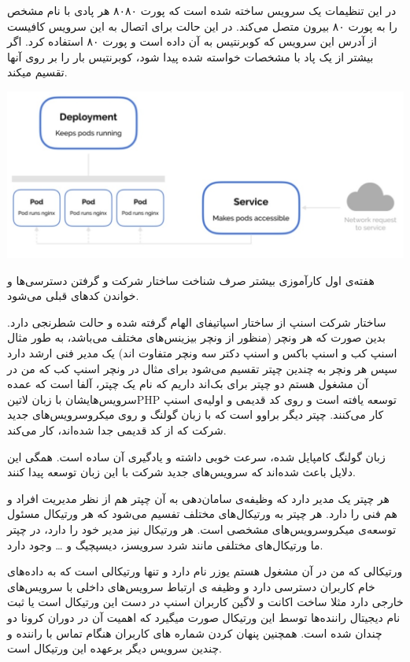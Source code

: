 \documentclass[a4]{report}
\begin{document}
در این تنظیمات یک سرویس ساخته شده است که پورت ۸۰۸۰ هر پادی با نام مشخص را به پورت ۸۰
بیرون متصل می‌کند. در این حالت برای اتصال به این سرویس کافیست از آدرس این سرویس که کوبرنتیس
به آن داده است و پورت ۸۰ استفاده کرد. اگر بیشتر از یک پاد با مشخصات خواسته شده پیدا شود، کوبرنتیس
بار را بر روی آنها تقسیم میکند.

\includegraphics[scale=0.5]{fig/service}


هفته‌ی اول کارآموزی بیشتر صرف شناخت ساختار شرکت و گرفتن دسترسی‌ها و خواندن کدهای قبلی می‌شود.

ساختار شرکت اسنپ از ساختار اسپاتیفای الهام گرفته شده و حالت شطرنجی دارد.
بدین صورت که هر ونچر (منظور از ونچر بیزینس‌های مختلف می‌باشد،
به طور مثال اسنپ کب و اسنپ باکس و اسنپ دکتر سه ونچر متفاوت اند)
یک مدیر فنی ارشد دارد سپس هر ونچر به چندین چپتر تقسیم می‌شود برای مثال در ونچر اسنپ کب که من در آن مشغول هستم
دو چپتر برای بک‌اند داریم که نام یک چپتر، آلفا است که عمده سرویس‌هایشان با زبان ‌لاتین{PHP} توسعه یافته است و روی کد قدیمی و اولیه‌ی اسنپ کار می‌کنند.
چپتر دیگر براوو است که با زبان گولنگ و روی میکروسرویس‌های جدید شرکت که از کد قدیمی جدا شده‌اند، کار می‌کند.

زبان گولنگ کامپایل شده، سرعت خوبی داشته و یادگیری آن ساده است. همگی این دلایل باعث شده‌اند که سرویس‌های جدید شرکت با این زبان توسعه پیدا کنند.

هر چپتر یک مدیر دارد که وظیفه‌ی سامان‌دهی به آن چپتر هم از نظر مدیریت افراد و هم فنی را دارد.
هر چپتر به ورتیکال‌های مختلف تفسیم می‌شود که هر ورتیکال مسئول توسعه‌ی میکروسرویس‌های مشخصی است.
هر ورتیکال نیز مدیر خود را دارد، در چپتر ما ورتیکال‌های مختلفی مانند شرد سرویسز، دیسپچیگ و … وجود دارد.

ورتیکالی که من در آن مشغول هستم یوزر نام دارد و تنها ورتیکالی است که به داده‌های خام کاربران دسترسی دارد و وظیفه ی ارتباط سرویس‌های داخلی
با سرویس‌های خارجی دارد مثلا ساخت اکانت و لاگین کاربران اسنپ در دست این ورتیکال است
یا ثبت نام دیجیتال راننده‌ها توسط این ورتیکال صورت میگیرد که اهمیت آن در دوران کرونا دو چندان شده است.
همچنین پنهان کردن شماره های کاربران هنگام تماس با راننده و چندین سرویس دیگر برعهده این ورتیکال است.
\end{document}
